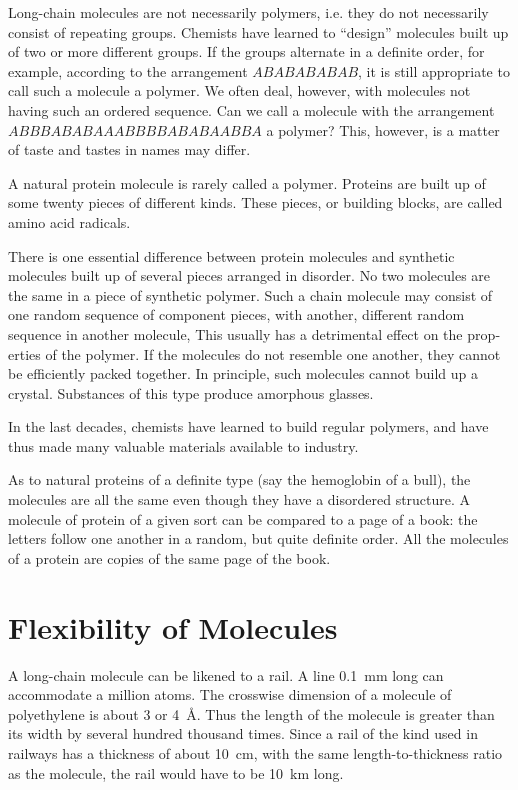 Long-chain molecules are not necessarily polymers, i.e. they do not necessarily consist of repeating groups. Chemists have learned to ``design'' molecules built up of two or more different groups. If the groups alternate in a definite order, for example, according to the ar­rangement $ABABABABAB$, it is still appropriate to call such a molecule a polymer. We often deal, however, with molecules not having such an ordered sequence. Can we call a molecule with the arrangement $ABBBABABAAABBBBABABAABBA$ a polymer? This, however, is a matter of taste and tastes in names may differ.

A natural protein molecule is rarely called a polymer. Proteins are built up of some twenty pieces of different kinds. These pieces, or building blocks, are called amino acid radicals.

There is one essential difference between protein mole­cules and synthetic molecules built up of several pieces arranged in disorder. No two molecules are the same in a piece of synthetic polymer. Such a chain molecule may consist of one random sequence of component pieces, with another, different random sequence in another mol­ecule, This usually has a detrimental effect on the prop­erties of the polymer. If the molecules do not resemble one another, they cannot be efficiently packed together. In principle, such molecules cannot build up a crystal. Substances of this type produce amorphous glasses.

In the last decades, chemists have learned to build regular polymers, and have thus made many valuable materials available to industry.

As to natural proteins of a definite type (say the hem­oglobin of a bull), the molecules are all the same even though they have a disordered structure. A molecule of protein of a given sort can be compared to a page of a book: the letters follow one another in a random, but quite definite order. All the molecules of a protein are copies of the same page of the book.

\section{Flexibility of Molecules}

A long-chain molecule can be likened to a rail. A line \SI{0.1}{\milli\meter} long can accommodate a million atoms. The crosswise dimension of a molecule of polyethylene is about 3 or \SI{4}{\angstrom}. Thus the length of the molecule is greater than its width by several hundred thousand times. Since a rail of the kind used in railways has a thickness of about \SI{10}{\centi\meter}, with the same length-to-thickness ratio as the molecule, the rail would have to be \SI{10}{\kilo\meter} long.

